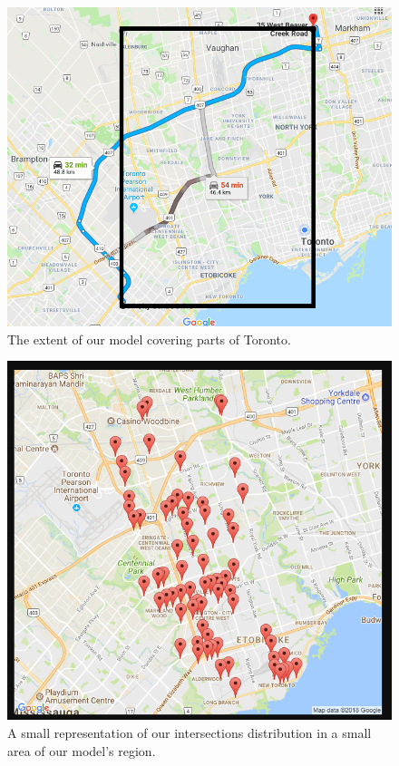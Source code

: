 \documentclass[Proceedings]{ascelike}
\begin{document}
\begin{figure}[H]
    \centering
    \includegraphics[scale = 0.55]{range.png}
    \caption{The extent of our model covering parts of Toronto.}
    \label{fig1:range}
\end{figure}

\begin{figure}[H]
    \centering
    \includegraphics[scale = 0.55]{sample.png}
    \caption{A small representation of our intersections distribution in a small area of our model's region.}
    \label{fig1:sample}
\end{figure}
\end{document}
